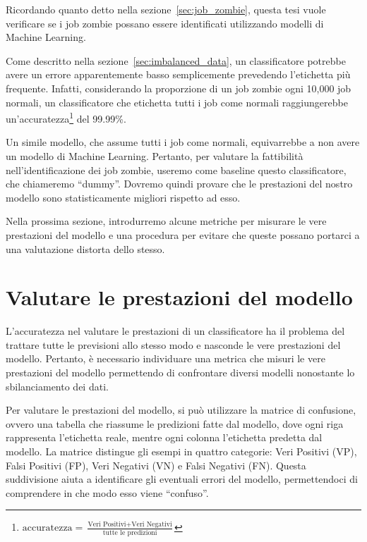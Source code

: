 \label{chap:valutazioni}

Ricordando quanto detto nella sezione~\ref{sec:job_zombie}, questa tesi vuole
verificare se i job zombie possano essere identificati utilizzando modelli di
Machine Learning.

Come descritto nella sezione~\ref{sec:imbalanced_data}, un classificatore
potrebbe avere un errore apparentemente basso semplicemente prevedendo
l'etichetta più frequente. Infatti, considerando la proporzione di un job
zombie ogni 10,000 job normali, un classificatore che etichetta tutti i job
come normali raggiungerebbe
un'accuratezza\footnote{$\text{accuratezza}=\frac{\text{Veri
Positivi}+\text{Veri Negativi}}{\text{tutte le predizioni}}$} del 99.99\%.

Un simile modello, che assume tutti i job come normali, equivarrebbe a non
avere un modello di Machine Learning. Pertanto, per valutare la fattibilità
nell'identificazione dei job zombie, useremo come baseline questo
classificatore, che chiameremo ``dummy''. Dovremo quindi provare che le
prestazioni del nostro modello sono statisticamente migliori rispetto ad esso.

Nella prossima sezione, introdurremo alcune metriche per misurare le vere
prestazioni del modello e una procedura per evitare che queste possano
portarci a una valutazione distorta dello stesso.

\section{Valutare le prestazioni del modello}

L'accuratezza nel valutare le prestazioni di un classificatore ha il problema
del trattare tutte le previsioni allo stesso modo e nasconde le vere
prestazioni del modello. Pertanto, è necessario individuare una metrica che
misuri le vere prestazioni del modello permettendo di confrontare diversi
modelli nonostante lo sbilanciamento dei dati.

Per valutare le prestazioni del modello, si può utilizzare la matrice di
confusione, ovvero una tabella che riassume le predizioni fatte dal modello,
dove ogni riga rappresenta l'etichetta reale, mentre ogni colonna l'etichetta
predetta dal modello. La matrice distingue gli esempi in quattro categorie:
Veri Positivi (VP), Falsi Positivi (FP), Veri Negativi (VN) e Falsi Negativi
(FN). Questa suddivisione aiuta a identificare gli eventuali errori del
modello, permettendoci di comprendere in che modo esso viene ``confuso''.

